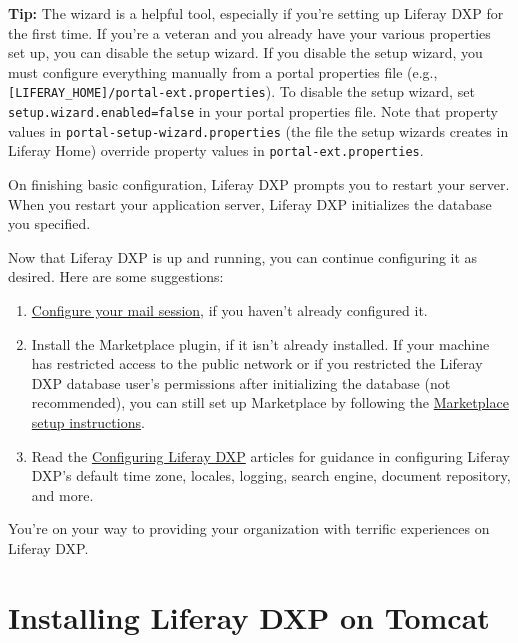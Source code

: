 \noindent\hrulefill

\textbf{Tip:} The wizard is a helpful tool, especially if you're setting
up Liferay DXP for the first time. If you're a veteran and you already
have your various properties set up, you can disable the setup wizard.
If you disable the setup wizard, you must configure everything manually
from a portal properties file (e.g.,
\texttt{{[}LIFERAY\_HOME{]}/portal-ext.properties}). To disable the
setup wizard, set \texttt{setup.wizard.enabled=false} in your portal
properties file. Note that property values in
\texttt{portal-setup-wizard.properties} (the file the setup wizards
creates in Liferay Home) override property values in
\texttt{portal-ext.properties}.

\noindent\hrulefill

On finishing basic configuration, Liferay DXP prompts you to restart
your server. When you restart your application server, Liferay DXP
initializes the database you specified.

Now that Liferay DXP is up and running, you can continue configuring it
as desired. Here are some suggestions:

\begin{enumerate}
\def\labelenumi{\arabic{enumi}.}
\item
  \href{/docs/7-2/deploy/-/knowledge_base/d/configuring-mail}{Configure
  your mail session}, if you haven't already configured it.
\item
  Install the Marketplace plugin, if it isn't already installed. If your
  machine has restricted access to the public network or if you
  restricted the Liferay DXP database user's permissions after
  initializing the database (not recommended), you can still set up
  Marketplace by following the
  \href{/docs/7-2/deploy/-/knowledge_base/d/setting-up-marketplace-and-portal-security}{Marketplace
  setup instructions}.
\item
  Read the
  \href{/docs/7-2/deploy/-/knowledge_base/d/configuring-product}{Configuring
  Liferay DXP} articles for guidance in configuring Liferay DXP's
  default time zone, locales, logging, search engine, document
  repository, and more.
\end{enumerate}

You're on your way to providing your organization with terrific
experiences on Liferay DXP.

\chapter{Installing Liferay DXP on
Tomcat}\label{installing-liferay-dxp-on-tomcat}

